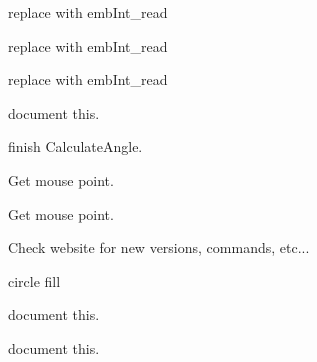 \begin{DoxyRefList}
%
replace with emb\+Int\+\_\+read  
\item[Member \mbox{\hyperlink{formats_8c_a760e806c16c1612a6b5ca5a26bc736d1}{binary\+Write\+UShort}} (FILE $\ast$f, unsigned short data)]\label{todo__todo000243}%
%
replace with emb\+Int\+\_\+read  
\item[Member \mbox{\hyperlink{formats_8c_ac93ea02c7dfc79fb81e7e7cc5acea14a}{binary\+Write\+UShort\+BE}} (FILE $\ast$f, unsigned short data)]\label{todo__todo000244}%
%
replace with emb\+Int\+\_\+read  
\item[Member \mbox{\hyperlink{imgui__main_8c_ae14cb14b32162b75b166f20424ac698b}{button\+\_\+tip\+\_\+of\+\_\+the\+\_\+day\+\_\+clicked}} (int button)]\label{todo__todo000166}%
%
document this.  
\item[Member \mbox{\hyperlink{imgui__main_8c_a6d3433fd7ebb707563972aad2dbb0d54}{calculate\+\_\+angle}} (Emb\+Real x1, Emb\+Real y1, Emb\+Real x2, Emb\+Real y2)]\label{todo__todo000194}%
%
finish Calculate\+Angle.  
\item[Member \mbox{\hyperlink{imgui__main_8c_aa6ad3110116034fee8d590f7e379f7af}{calculate\+\_\+angle\+\_\+action}} (void)]\label{todo__todo000154}%
%
Get mouse point.  
\item[Member \mbox{\hyperlink{imgui__main_8c_a4111bee970d2262f92a8849ac1d2141d}{calculate\+\_\+distance\+\_\+action}} (void)]\label{todo__todo000155}%
%
Get mouse point.  
\item[Member \mbox{\hyperlink{imgui__main_8c_a66ef6ad8d060652b27ea3b6cee926756}{check\+For\+Updates}} (void)]\label{todo__todo000164}%
%
Check website for new versions, commands, etc...  
\item[Member \mbox{\hyperlink{imgui__main_8c_afddf9cfeda422b14ccd5d9f927288e9a}{circle\+\_\+action}} (void)]\label{todo__todo000105}%
%
circle fill  
\item[Member \mbox{\hyperlink{imgui__main_8c_afdedb6d22961c7bf7aec4f22a2287e98}{clear\+\_\+rubber}} (void)]\label{todo__todo000187}%
%
document this.  
\item[Member \mbox{\hyperlink{imgui__main_8c_af8c1680540296b4a2adacb15e57c295e}{clear\+Rubber\+Room}} (void)]\label{todo__todo000042}%
%
document this.  
\item[Member \mbox{\hyperlink{imgui__main_8c_a712db8de54d9461d1a106c9a7aac0d10}{close\+\_\+action}} (void)]\label{todo__todo000106}%

\end{DoxyRefList}
